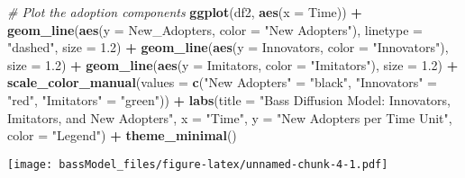 \documentclass[
]{article}
\newenvironment{Shaded}{\begin{snugshade}}{\end{snugshade}}
\newcommand{\AttributeTok}[1]{\textcolor[rgb]{0.13,0.29,0.53}{#1}}
\newcommand{\CommentTok}[1]{\textcolor[rgb]{0.56,0.35,0.01}{\textit{#1}}}
\newcommand{\FloatTok}[1]{\textcolor[rgb]{0.00,0.00,0.81}{#1}}
\newcommand{\FunctionTok}[1]{\textcolor[rgb]{0.13,0.29,0.53}{\textbf{#1}}}
\newcommand{\NormalTok}[1]{#1}
\newcommand{\OtherTok}[1]{\textcolor[rgb]{0.56,0.35,0.01}{#1}}
\newcommand{\SpecialCharTok}[1]{\textcolor[rgb]{0.81,0.36,0.00}{\textbf{#1}}}
\newcommand{\StringTok}[1]{\textcolor[rgb]{0.31,0.60,0.02}{#1}}
\begin{document}
\begin{Shaded}
\begin{Highlighting}[]
\CommentTok{\# Plot the adoption components}
\FunctionTok{ggplot}\NormalTok{(df2, }\FunctionTok{aes}\NormalTok{(}\AttributeTok{x =}\NormalTok{ Time)) }\SpecialCharTok{+}
  \FunctionTok{geom\_line}\NormalTok{(}\FunctionTok{aes}\NormalTok{(}\AttributeTok{y =}\NormalTok{ New\_Adopters, }\AttributeTok{color =} \StringTok{"New Adopters"}\NormalTok{), }\AttributeTok{linetype =} \StringTok{"dashed"}\NormalTok{, }\AttributeTok{size =} \FloatTok{1.2}\NormalTok{) }\SpecialCharTok{+}
  \FunctionTok{geom\_line}\NormalTok{(}\FunctionTok{aes}\NormalTok{(}\AttributeTok{y =}\NormalTok{ Innovators, }\AttributeTok{color =} \StringTok{"Innovators"}\NormalTok{), }\AttributeTok{size =} \FloatTok{1.2}\NormalTok{) }\SpecialCharTok{+}
  \FunctionTok{geom\_line}\NormalTok{(}\FunctionTok{aes}\NormalTok{(}\AttributeTok{y =}\NormalTok{ Imitators, }\AttributeTok{color =} \StringTok{"Imitators"}\NormalTok{), }\AttributeTok{size =} \FloatTok{1.2}\NormalTok{) }\SpecialCharTok{+}
  \FunctionTok{scale\_color\_manual}\NormalTok{(}\AttributeTok{values =} \FunctionTok{c}\NormalTok{(}\StringTok{"New Adopters"} \OtherTok{=} \StringTok{"black"}\NormalTok{, }\StringTok{"Innovators"} \OtherTok{=} \StringTok{"red"}\NormalTok{, }\StringTok{"Imitators"} \OtherTok{=} \StringTok{"green"}\NormalTok{)) }\SpecialCharTok{+}
  \FunctionTok{labs}\NormalTok{(}\AttributeTok{title =} \StringTok{"Bass Diffusion Model: Innovators, Imitators, and New Adopters"}\NormalTok{,}
       \AttributeTok{x =} \StringTok{"Time"}\NormalTok{,}
       \AttributeTok{y =} \StringTok{"New Adopters per Time Unit"}\NormalTok{,}
       \AttributeTok{color =} \StringTok{"Legend"}\NormalTok{) }\SpecialCharTok{+}
  \FunctionTok{theme\_minimal}\NormalTok{()}
\end{Highlighting}
\end{Shaded}

\texttt{[image: bassModel\_files/figure-latex/unnamed-chunk-4-1.pdf]}
\end{document}
